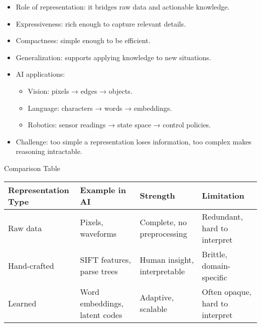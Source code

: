 \documentclass[
  letterpaper,
  DIV=11,
  numbers=noendperiod]{scrreprt}
\providecommand{\tightlist}{%
  \setlength{\itemsep}{0pt}\setlength{\parskip}{0pt}}
\begin{document}
\begin{itemize}
\item
  Role of representation: it bridges raw data and actionable knowledge.
\item
  Expressiveness: rich enough to capture relevant details.
\item
  Compactness: simple enough to be efficient.
\item
  Generalization: supports applying knowledge to new situations.
\item
  AI applications:

  \begin{itemize}
  \tightlist
  \item
    Vision: pixels → edges → objects.
  \item
    Language: characters → words → embeddings.
  \item
    Robotics: sensor readings → state space → control policies.
  \end{itemize}
\item
  Challenge: too simple a representation loses information, too complex
  makes reasoning intractable.
\end{itemize}

Comparison Table

\begin{longtable}[]{@{}
  >{\raggedright\arraybackslash}p{}
  >{\raggedright\arraybackslash}p{}
  >{\raggedright\arraybackslash}p{}
  >{\raggedright\arraybackslash}p{}@{}}
\toprule\noalign{}
\begin{minipage}[b]{\linewidth}\raggedright
Representation Type
\end{minipage} & \begin{minipage}[b]{\linewidth}\raggedright
Example in AI
\end{minipage} & \begin{minipage}[b]{\linewidth}\raggedright
Strength
\end{minipage} & \begin{minipage}[b]{\linewidth}\raggedright
Limitation
\end{minipage} \\
\midrule\noalign{}
\endhead
\bottomrule\noalign{}
\endlastfoot
Raw data & Pixels, waveforms & Complete, no preprocessing & Redundant,
hard to interpret \\
Hand-crafted & SIFT features, parse trees & Human insight, interpretable
& Brittle, domain-specific \\
Learned & Word embeddings, latent codes & Adaptive, scalable & Often
opaque, hard to interpret \\
\end{longtable}
\end{document}
